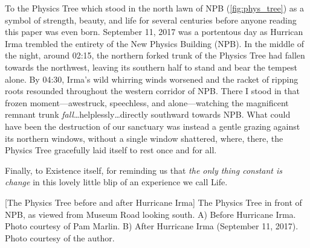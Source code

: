 To the Physics Tree which stood in the north lawn of NPB (\cref{fig:phys_tree}) as a symbol of strength, beauty, and life for several centuries before anyone reading this paper was even born.
September 11, 2017 was a portentous day as Hurrican Irma trembled the entirety of the New Physics Building (NPB).
In the middle of the night, around 02:15, the northern forked trunk of the Physics Tree had fallen towards the northwest, leaving its southern half to stand and bear the tempest alone.
By 04:30, Irma's wild whirring winds worsened and the racket of ripping roots resounded throughout the western corridor of NPB.
There I stood in that frozen moment---awestruck, speechless, and alone---watching the magnificent remnant trunk \emph{fall}\ldots helplessly\ldots directly southward towards NPB.
What could have been the destruction of our sanctuary was instead a gentle grazing against its northern windows, without a single window shattered, where, there, the Physics Tree gracefully laid itself to rest once and for all.

Finally, to Existence itself, for reminding us that \emph{the only thing constant is change} in this lovely little blip of an experience we call Life.

\begin{multiFigure}
    \centering
        [The Physics Tree before and after Hurricane Irma]
        {The Physics Tree in front of NPB, as viewed from Museum Road looking south.
        \;A) Before Hurricane Irma. Photo courtesy of Pam Marlin.
        \;B) After Hurricane Irma (September 11, 2017). Photo courtesy of the author.}
    \label{fig:phys_tree}
\end{multiFigure}